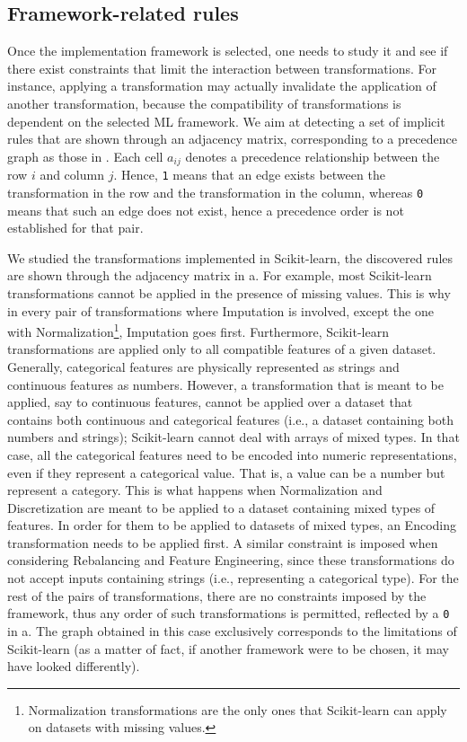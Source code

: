 \subsection{Framework-related rules}
\label{effective-ssec:rules-framework}

Once the implementation framework is selected, one needs to study it and see if there exist constraints that limit the interaction between transformations.
For instance, applying a transformation may actually invalidate the application of another transformation, because the compatibility of transformations is dependent on the selected ML framework.
We aim at detecting a set of implicit rules that are shown through an adjacency matrix, corresponding to a precedence graph as those in .
Each cell $a_{ij}$ denotes a precedence relationship between the row $i$ and column $j$.
Hence, \texttt{1} means that an edge exists between the transformation in the row and the transformation in the column, whereas \texttt{0} means that such an edge does not exist, hence a precedence order is not established for that pair.


\begin{example}
We studied the transformations implemented in Scikit-learn, the discovered rules are shown through the adjacency matrix in a.
For example, most Scikit-learn transformations cannot be applied in the presence of missing values.
This is why in every pair of transformations where Imputation is involved, except the one with Normalization\footnote{Normalization transformations are the only ones that Scikit-learn can apply on datasets with missing values.}, Imputation goes first.
Furthermore, Scikit-learn transformations are applied only to all compatible features of a given dataset.
Generally, categorical features are physically represented as strings and continuous features as numbers.
However, a transformation that is meant to be applied, say to continuous features, cannot be applied over a dataset that contains both continuous and categorical features (i.e., a dataset containing both numbers and strings); Scikit-learn cannot deal with arrays of mixed types.
In that case, all the categorical features need to be encoded into numeric representations, even if they represent a categorical value.
That is, a value can be a number but represent a category.
This is what happens when Normalization and Discretization are meant to be applied to a dataset containing mixed types of features.
In order for them to be applied to datasets of mixed types, an Encoding transformation needs to be applied first.
A similar constraint is imposed when considering Rebalancing and Feature Engineering, since these transformations do not accept inputs containing strings (i.e., representing a categorical type).
For the rest of the pairs of transformations, there are no constraints imposed by the framework, thus any order of such transformations is permitted, reflected by a \texttt{0} in a.
The graph obtained in this case exclusively corresponds to the limitations of Scikit-learn (as a matter of fact, if another framework were to be chosen, it may have looked differently).
\end{example}

